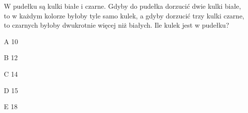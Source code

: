 \begin{tresc}
W pudełku są kulki białe i czarne. Gdyby do pudełka dorzucić dwie kulki białe, to w każdym kolorze byłoby tyle samo kulek, a gdyby dorzucić trzy kulki czarne, to czarnych byłoby dwukrotnie więcej niż białych. Ile kulek jest w pudełku?
\end{tresc}
\begin{wariant}{A} 10 \end{wariant}
\begin{wariant}{B} 12 \end{wariant}
\begin{wariant}{C} 14 \end{wariant}
\begin{wariant}{D} 15 \end{wariant}
\begin{wariant}{E} 18 \end{wariant}

